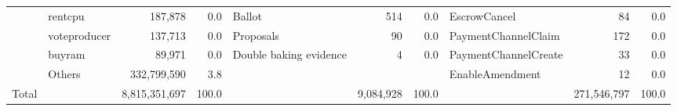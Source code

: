\begin{table}[htbp]
\begin{tabular}{llrrlrrlrr}
      & rentcpu &                187,878  &                0.0  & Ballot &                514  &         0.0  & EscrowCancel &                      84  &         0.0  \\
      & voteproducer &                137,713  &                0.0  & Proposals &                  90  &         0.0  & PaymentChannelClaim &                    172  &         0.0  \\
      & buyram &                  89,971  &                0.0  & Double baking evidence &                    4  &         0.0  & PaymentChannelCreate &                      33  &         0.0  \\
      & Others &        332,799,590  &                3.8  &   &   &   & EnableAmendment &                      12  &         0.0  \\
    \midrule
    \midrule
    Total &   &    8,815,351,697  &           100.0  &   &    9,084,928  &    100.0  &   &    271,546,797  &    100.0  \\
    \bottomrule
    \end{tabular}%
  \label{tab:addlabel}%
\end{table}%











